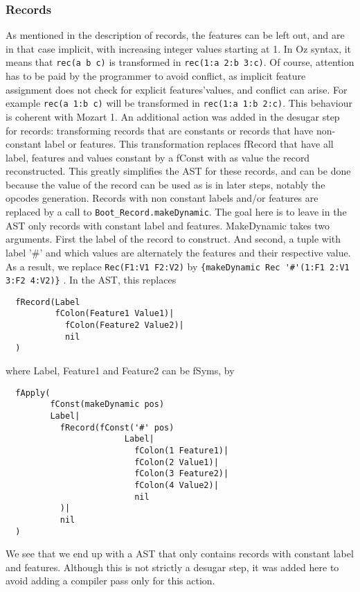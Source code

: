 \documentclass[a4paper]{memoir}
\begin{document}
\subsubsection{Records}
As mentioned in the description of records, the features can be left out, and are in that case implicit, with increasing integer values starting at 1.
In Oz syntax, it means that \lstinline!rec(a b c)! is transformed in \lstinline!rec(1:a 2:b 3:c)!. Of course, attention has to be paid by the programmer to avoid conflict, as implicit feature assignment does not check for explicit features'values, and conflict can arise. For example \lstinline!rec(a 1:b c)! will be transformed in \lstinline!rec(1:a 1:b 2:c)!. This behaviour is coherent with Mozart 1. %
An additional action was added in the desugar step for records: transforming records that are constants or records that have non-constant label or features. This transformation replaces fRecord that have all label, features and values constant by a fConst with as value the record reconstructed. This greatly simplifies the AST for these records, and can be done because the value of the record can be used as is in later steps, notably the opcodes generation. 
Records with non constant labels and/or features are replaced by a call to \lstinline!Boot_Record.makeDynamic!. The goal here is to leave in the AST only records with constant label and features. MakeDynamic takes two arguments. First the label of the record to construct. And second, a tuple with label '\#' and which values are alternately the features and their respective value. As a result, we replace \lstinline!Rec(F1:V1 F2:V2)! by \lstinline!{makeDynamic Rec '#'(1:F1 2:V1 3:F2 4:V2)}! .
In the AST, this replaces 
\begin{lstlisting}
  fRecord(Label 
          fColon(Feature1 Value1)|
            fColon(Feature2 Value2)|
            nil
  )
\end{lstlisting}
where Label, Feature1 and Feature2 can be fSyms, by
\begin{lstlisting}
  fApply(
         fConst(makeDynamic pos) 
         Label|
           fRecord(fConst('#' pos) 
                        Label|
                          fColon(1 Feature1)|
                          fColon(2 Value1)|
                          fColon(3 Feature2)|
                          fColon(4 Value2)|
                          nil 
           )|
           nil
  )
\end{lstlisting}
We see that we end up with a AST that only contains records with constant label and features.
Although this is not strictly a desugar step, it was added here to avoid adding a compiler pass only for this action.
\end{document}
